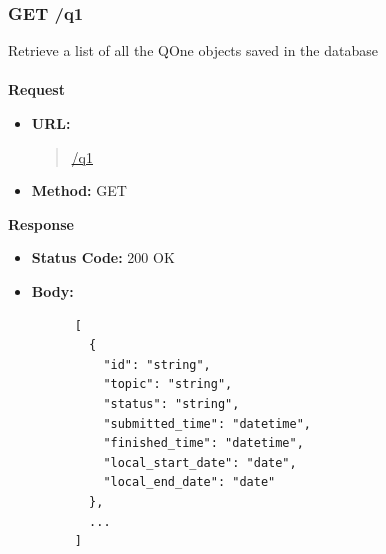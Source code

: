 \subsubsection{GET /q1}
Retrieve a list of all the QOne objects saved in the database \\\\
\textbf{Request}
\begin{itemize}
  \item \textbf{URL:}
  \begin{quote}
    \url{/q1}
  \end{quote}
  \item \textbf{Method:} GET
\end{itemize}\leavevmode\newline
\textbf{Response}
\begin{itemize}
  \item \textbf{Status Code:} 200 OK
  \item \textbf{Body:}
    \begin{lstlisting}
      [
        {
          "id": "string",
          "topic": "string",
          "status": "string",
          "submitted_time": "datetime",
          "finished_time": "datetime",
          "local_start_date": "date",
          "local_end_date": "date"
        },
        ...
      ]
    \end{lstlisting}
\end{itemize}


